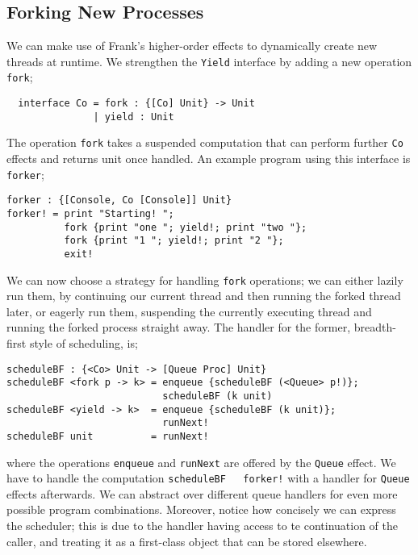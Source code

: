 \documentclass[msc,deptreport,cs]{infthesis} %
\newcommand{\code}[1]{\lstinline{#1}}
\begin{document}
\subsection{Forking New Processes}
\label{subsec:forking-new-processes}

We can make use of Frank's higher-order effects to dynamically create new
threads at runtime. We strengthen the \code{Yield} interface by adding a new
operation \code{fork};

\begin{lstlisting}
  interface Co = fork : {[Co] Unit} -> Unit
               | yield : Unit
\end{lstlisting}

The operation \code{fork} takes a suspended computation that can perform further
\code{Co} effects and returns unit once handled. An example program using this
interface is \code{forker};

\begin{lstlisting}
forker : {[Console, Co [Console]] Unit}
forker! = print "Starting! ";
          fork {print "one "; yield!; print "two "};
          fork {print "1 "; yield!; print "2 "};
          exit!
\end{lstlisting}

We can now choose a strategy for handling \code{fork} operations; we can either
lazily run them, by continuing our current thread and then running the forked
thread later, or eagerly run them, suspending the currently executing thread and
running the forked process straight away. The handler for the former,
breadth-first style of scheduling, is;

\begin{lstlisting}
scheduleBF : {<Co> Unit -> [Queue Proc] Unit}
scheduleBF <fork p -> k> = enqueue {scheduleBF (<Queue> p!)};
                           scheduleBF (k unit)
scheduleBF <yield -> k>  = enqueue {scheduleBF (k unit)};
                           runNext!
scheduleBF unit          = runNext!
\end{lstlisting}

\noindent where the operations \code{enqueue} and \code{runNext} are offered by
the \code{Queue} effect. We have to handle the computation \code{scheduleBF
  forker!} with a handler for \code{Queue} effects afterwards. We can abstract
over different queue handlers for even more possible program combinations.
Moreover, notice how concisely we can express the scheduler; this is due to the
handler having access to te continuation of the caller, and treating it as a
first-class object that can be stored elsewhere.
\end{document}
